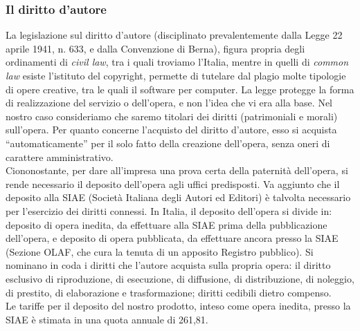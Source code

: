 \subsubsection{Il diritto d'autore}
La legislazione sul diritto d'autore (disciplinato prevalentemente dalla Legge 22 aprile 1941, n. 633, e dalla Convenzione di Berna), figura propria degli ordinamenti di \textit{civil law}, tra i quali troviamo l'Italia, mentre in quelli di \textit{common law} esiste l'istituto del copyright, permette di tutelare dal plagio molte tipologie di opere creative, tra le quali il software per computer. La legge protegge la forma di realizzazione del servizio o dell'opera, e non l'idea che vi era alla base. Nel nostro caso consideriamo che saremo titolari dei diritti (patrimoniali e morali) sull'opera. Per quanto concerne l'acquisto del diritto d'autore, esso si acquista ``automaticamente'' per il solo fatto della creazione dell'opera, senza oneri di carattere amministrativo.\\
Ciononostante, per dare all'impresa una prova certa della paternità dell'opera, si rende necessario il deposito dell'opera agli uffici predisposti. Va aggiunto che il deposito alla SIAE (Società Italiana degli Autori ed Editori) è talvolta necessario per l'esercizio dei diritti connessi. In Italia, il deposito dell'opera si divide in: deposito di opera inedita, da effettuare alla SIAE prima della pubblicazione dell'opera, e deposito di opera pubblicata, da effettuare ancora presso la SIAE (Sezione OLAF, che cura la tenuta di un apposito Registro pubblico). Si nominano in coda i diritti che l'autore acquista sulla propria opera: il diritto esclusivo di riproduzione, di esecuzione, di diffusione, di distribuzione, di noleggio, di prestito, di elaborazione e trasformazione; diritti cedibili dietro compenso.\\
Le tariffe per il deposito del nostro prodotto, inteso come opera inedita, presso la SIAE è stimata in una quota annuale di 261,81\officialeuro.

